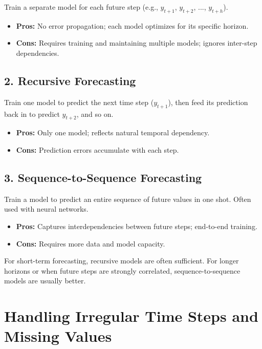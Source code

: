 \documentclass[12pt,openany]{book}
\begin{document}
Train a separate model for each future step (e.g., $y_{t+1}$, $y_{t+2}$, ..., $y_{t+h}$).

\begin{itemize}
    \item \textbf{Pros:} No error propagation; each model optimizes for its specific horizon.
    \item \textbf{Cons:} Requires training and maintaining multiple models; ignores inter-step dependencies.
\end{itemize}

\subsection*{2. Recursive Forecasting}

Train one model to predict the next time step ($y_{t+1}$), then feed its prediction back in to predict $y_{t+2}$, and so on.

\begin{itemize}
    \item \textbf{Pros:} Only one model; reflects natural temporal dependency.
    \item \textbf{Cons:} Prediction errors accumulate with each step.
\end{itemize}

\subsection*{3. Sequence-to-Sequence Forecasting}

Train a model to predict an entire sequence of future values in one shot. Often used with neural networks.

\begin{itemize}
    \item \textbf{Pros:} Captures interdependencies between future steps; end-to-end training.
    \item \textbf{Cons:} Requires more data and model capacity.
\end{itemize}

\begin{notebox}
For short-term forecasting, recursive models are often sufficient. For longer horizons or when future steps are strongly correlated, sequence-to-sequence models are usually better.
\end{notebox}



\section{Handling Irregular Time Steps and Missing Values}
\end{document}
